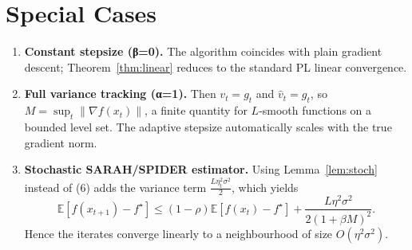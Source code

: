 \documentclass{article}
\newcommand{\EE}{\mathbb{E}}
\begin{document}
\section*{Special Cases}
\begin{enumerate}
\item \textbf{Constant stepsize (β=0).} The algorithm coincides with plain gradient descent; Theorem~\ref{thm:linear} reduces to the standard PL linear convergence.
\item \textbf{Full variance tracking (α=1).} Then $v_{t}=g_{t}$ and $\hat v_{t}=g_{t}$, so $M=\sup_{t}\|\nabla f(x_{t})\|$, a finite quantity for $L$‑smooth functions on a bounded level set. The adaptive stepsize automatically scales with the true gradient norm.
\item \textbf{Stochastic SARAH/SPIDER estimator.} Using Lemma~\ref{lem:stoch} instead of (6) adds the variance term $\frac{L\eta_{t}^{2}\sigma^{2}}{2}$, which yields
\[
\EE[f(x_{t+1})-f^{\star}]
\le (1-\rho)\EE[f(x_{t})-f^{\star}]
+\frac{L\eta^{2}\sigma^{2}}{2(1+\beta M)^{2}} .
\]
Hence the iterates converge linearly to a neighbourhood of size $O(\eta^{2}\sigma^{2})$.
\end{enumerate}
\end{document}
